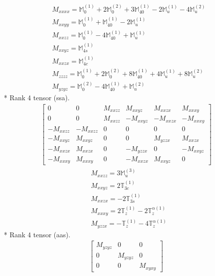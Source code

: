 \documentclass[fleqn,8pt,landscape]{jsarticle}
\begin{document}
\begin{align*}
& M_{xxxx} = \mathbb{M}_{0}^{(1)} + 2 \mathbb{M}_{0}^{(2)} + 3 \mathbb{M}_{40}^{(1)} - 2 \mathbb{M}_{u}^{(1)} - 4 \mathbb{M}_{u}^{(2)} \\
& M_{xxyy} = \mathbb{M}_{0}^{(1)} + \mathbb{M}_{40}^{(1)} - 2 \mathbb{M}_{u}^{(1)} \\
& M_{xxzz} = \mathbb{M}_{0}^{(1)} - 4 \mathbb{M}_{40}^{(1)} + \mathbb{M}_{u}^{(1)} \\
& M_{xxyz} = \mathbb{M}_{4s}^{(1)} \\
& M_{xxzx} = \mathbb{M}_{4c}^{(1)} \\
& M_{zzzz} = \mathbb{M}_{0}^{(1)} + 2 \mathbb{M}_{0}^{(2)} + 8 \mathbb{M}_{40}^{(1)} + 4 \mathbb{M}_{u}^{(1)} + 8 \mathbb{M}_{u}^{(2)} \\
& M_{yzyz} = \mathbb{M}_{0}^{(2)} - 4 \mathbb{M}_{40}^{(1)} + \mathbb{M}_{u}^{(2)}
\end{align*}
* Rank 4 tensor (ssa).
\begin{align*}
\begin{bmatrix} 0 & 0 & M_{xxzz} & M_{xxyz} & M_{xxzx} & M_{xxxy} \\ 0 & 0 & M_{xxzz} & - M_{xxyz} & - M_{xxzx} & - M_{xxxy} \\ - M_{xxzz} & - M_{xxzz} & 0 & 0 & 0 & 0 \\ - M_{xxyz} & M_{xxyz} & 0 & 0 & M_{yzzx} & M_{xxzx} \\ - M_{xxzx} & M_{xxzx} & 0 & - M_{yzzx} & 0 & - M_{xxyz} \\ - M_{xxxy} & M_{xxxy} & 0 & - M_{xxzx} & M_{xxyz} & 0 \end{bmatrix}
\end{align*}
\begin{align*}
& M_{xxzz} = 3 \mathbb{M}_{u}^{(3)} \\
& M_{xxyz} = 2 \mathbb{T}_{3c}^{(1)} \\
& M_{xxzx} = - 2 \mathbb{T}_{3s}^{(1)} \\
& M_{xxxy} = 2 \mathbb{T}_{z}^{(1)} - 2 \mathbb{T}_{z}^{\alpha(1)} \\
& M_{yzzx} = - \mathbb{T}_{z}^{(1)} - 4 \mathbb{T}_{z}^{\alpha(1)}
\end{align*}
* Rank 4 tensor (aas).
\begin{align*}
\begin{bmatrix} M_{yzyz} & 0 & 0 \\ 0 & M_{yzyz} & 0 \\ 0 & 0 & M_{xyxy} \end{bmatrix}
\end{align*}
\end{document}
